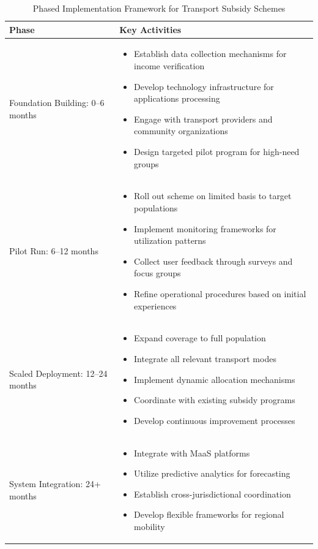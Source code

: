 \documentclass[a4paper,fleqn]{cas-sc}
\begin{document}
\begin{table}[htbp]
\centering
\caption{Phased Implementation Framework for Transport Subsidy Schemes}
\label{tab:implementation_framework}
\begin{tabular}{p{2.5cm}p{12cm}}
\toprule
\textbf{Phase} & \textbf{Key Activities} \\
\midrule
Foundation Building: 0--6 months & 
\begin{itemize}
    \item Establish data collection mechanisms for income verification
    \item Develop technology infrastructure for applications processing
    \item Engage with transport providers and community organizations
    \item Design targeted pilot program for high-need groups
\end{itemize} \\
\midrule
Pilot Run: 6--12 months & 
\begin{itemize}
    \item Roll out scheme on limited basis to target populations
    \item Implement monitoring frameworks for utilization patterns
    \item Collect user feedback through surveys and focus groups
    \item Refine operational procedures based on initial experiences
\end{itemize} \\
\midrule
Scaled Deployment: 12--24 months & 
\begin{itemize}
    \item Expand coverage to full population
    \item Integrate all relevant transport modes
    \item Implement dynamic allocation mechanisms
    \item Coordinate with existing subsidy programs
    \item Develop continuous improvement processes
\end{itemize} \\
\midrule
System Integration: 24+ months & 
\begin{itemize}
    \item Integrate with MaaS platforms
    \item Utilize predictive analytics for forecasting
    \item Establish cross-jurisdictional coordination
    \item Develop flexible frameworks for regional mobility
\end{itemize} \\
\bottomrule
\end{tabular}
\end{table}
\end{document}
